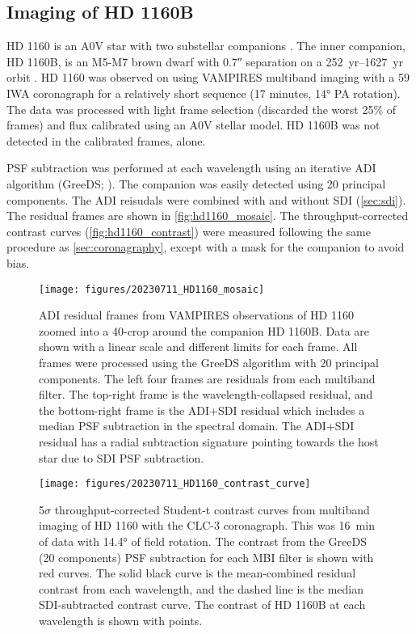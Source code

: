 
\subsection{Imaging of HD 1160B\label{sec:hd1160}}

HD 1160 is an A0V star with two substellar companions \citep{nielsen_gemini_2012,maire_first_2016,garcia_scexao_2017,mesa_characterizing_2020}. The inner companion, HD 1160B, is an M5-M7 brown dwarf with \ang{;;0.7} separation on a \SIrange{252}{1627}{yr} orbit \citep{blunt_orbits_2017}. HD 1160 was observed on  using VAMPIRES multiband imaging with a \SI{59}{\mas} IWA coronagraph for a relatively short sequence (17 minutes, \ang{14} PA rotation). The data was processed with light frame selection (discarded the worst 25\% of frames) and flux calibrated using an A0V stellar model. HD 1160B was not detected in the calibrated frames, alone.

PSF subtraction was performed at each wavelength using an iterative ADI algorithm (GreeDS; \citealt{pairet_reference-less_2019,pairet_mayonnaise_2020,stapper_iterative_2022}). The companion was easily detected using 20 principal components. The ADI reisudals were combined with and without SDI (\autoref{sec:sdi}). The residual frames are shown in \autoref{fig:hd1160_mosaic}. The throughput-corrected contrast curves (\autoref{fig:hd1160_contrast}) were measured following the same procedure as \autoref{sec:coronagraphy}, except with a mask for the companion to avoid bias.

\begin{figure*}[t]
    \centering
    \texttt{[image: figures/20230711\_HD1160\_mosaic]}
    \caption{ADI residual frames from VAMPIRES observations of HD 1160 zoomed into a \SI{40}{\pixel}-crop around the companion HD 1160B. Data are shown with a linear scale and different limits for each frame. All frames were processed using the GreeDS algorithm with 20 principal components. The left four frames are residuals from each multiband filter. The top-right frame is the wavelength-collapsed residual, and the bottom-right frame is the ADI+SDI residual which includes a median PSF subtraction in the spectral domain. The ADI+SDI residual has a radial subtraction signature pointing towards the host star due to SDI PSF subtraction.\label{fig:hd1160_mosaic}}
\end{figure*}

\begin{figure}
    \centering
    \texttt{[image: figures/20230711\_HD1160\_contrast\_curve]}
    \caption{5$\sigma$ throughput-corrected Student-t contrast curves from multiband imaging of HD 1160 with the CLC-3 coronagraph. This was \SI{16}{\minute} of data with \ang{14.4} of field rotation. The contrast from the GreeDS (20 components) PSF subtraction for each MBI filter is shown with red curves. The solid black curve is the mean-combined residual contrast from each wavelength, and the dashed line is the median SDI-subtracted contrast curve. The contrast of HD 1160B at each wavelength is shown with points.\label{fig:hd1160_contrast}}
\end{figure}


